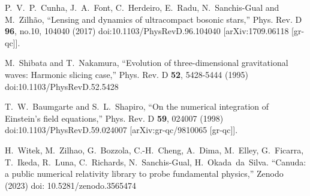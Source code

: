 \begin{thebibliography}{9}

P.~V.~P.~Cunha, J.~A.~Font, C.~Herdeiro, E.~Radu, N.~Sanchis-Gual and M.~Zilh\~ao,
``Lensing and dynamics of ultracompact bosonic stars,''
Phys. Rev. D \textbf{96}, no.10, 104040 (2017)
doi:10.1103/PhysRevD.96.104040
[arXiv:1709.06118 [gr-qc]].

M.~Shibata and T.~Nakamura,
``Evolution of three-dimensional gravitational waves: Harmonic slicing case,''
Phys. Rev. D \textbf{52}, 5428-5444 (1995)
doi:10.1103/PhysRevD.52.5428

T.~W.~Baumgarte and S.~L.~Shapiro,
``On the numerical integration of Einstein's field equations,''
Phys. Rev. D \textbf{59}, 024007 (1998)
doi:10.1103/PhysRevD.59.024007
[arXiv:gr-qc/9810065 [gr-qc]].

H.~Witek, M.~Zilhao, G.~Bozzola, C.-H.~Cheng, A.~Dima, M.~Elley, G.~Ficarra, T.~Ikeda, R.~Luna, C.~Richards, N.~Sanchis-Gual, H.~Okada~da~Silva.
``Canuda: a public numerical relativity library to probe fundamental physics,''
Zenodo (2023)
doi: 10.5281/zenodo.3565474

\end{thebibliography}



